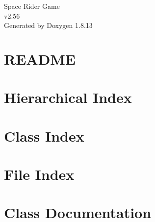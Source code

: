 \documentclass[twoside]{book}
\newcommand{\+}{\discretionary{\mbox{\scriptsize$\hookleftarrow$}}{}{}}
\newcommand{\clearemptydoublepage}{%
  \newpage{\pagestyle{empty}\cleardoublepage}%
}
\begin{document}
\hypersetup{pageanchor=false,
             bookmarksnumbered=true,
             pdfencoding=unicode
            }
\begin{titlepage}
\vspace*{7cm}
\begin{center}%
{\Large Space Rider Game \\[1ex]\large v2.\+56 }\\
\vspace*{1cm}
{\large Generated by Doxygen 1.8.13}\\
\end{center}
\end{titlepage}
\clearemptydoublepage
{}
\tableofcontents
\clearemptydoublepage
{}
\hypersetup{pageanchor=true}

\chapter{R\+E\+A\+D\+ME}
\label{md__c_1__users__user__documents__software_dev2_project__space_rider_project__r_e_a_d_m_e}

\chapter{Hierarchical Index}

\chapter{Class Index}

\chapter{File Index}

\chapter{Class Documentation}






























\end{document}
